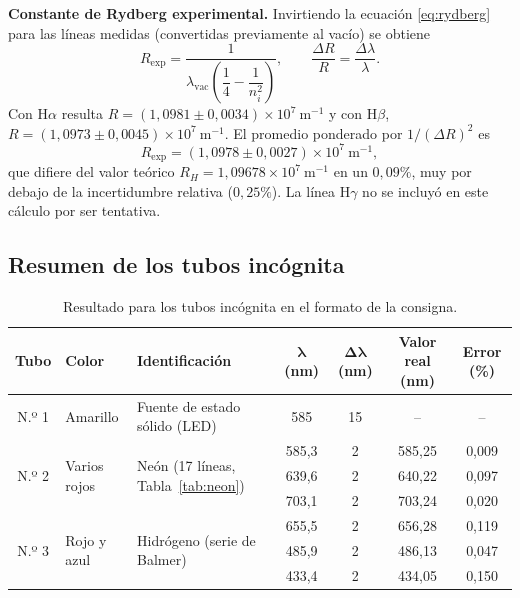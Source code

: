 \documentclass{article}
\begin{document}
\textbf{Constante de Rydberg experimental.} Invirtiendo la ecuación \eqref{eq:rydberg} para las líneas medidas (convertidas previamente al vacío) se obtiene
\begin{equation}
    R_{\mathrm{exp}}=\frac{1}{\lambda_{\mathrm{vac}}\left(\dfrac{1}{4}-\dfrac{1}{n_i^2}\right)},
    \qquad
    \frac{\Delta R}{R}=\frac{\Delta\lambda}{\lambda}.
\end{equation}
Con H$\alpha$ resulta $R=(1,0981\pm0,0034)\times10^{7}\ \mathrm{m^{-1}}$ y con H$\beta$, $R=(1,0973\pm0,0045)\times10^{7}\ \mathrm{m^{-1}}$. El promedio ponderado por $1/(\Delta R)^2$ es
\begin{equation}
    R_{\mathrm{exp}}=(1,0978\pm0,0027)\times10^{7}\ \mathrm{m^{-1}},
\end{equation}
que difiere del valor teórico $R_H=1,09678\times10^{7}\ \mathrm{m^{-1}}$ en un $0,09\%$, muy por debajo de la incertidumbre relativa ($0,25\%$). La línea H$\gamma$ no se incluyó en este cálculo por ser tentativa.

\subsection{Resumen de los tubos incógnita}

\begin{table}[H]
\centering\small
\caption{Resultado para los tubos incógnita en el formato de la consigna.}
\label{tab:incognitas}
\begin{tabular}{@{}cllcccc@{}}
\toprule
\textbf{Tubo} & \textbf{Color} & \textbf{Identificación} & $\boldsymbol{\lambda}$ \textbf{(nm)} & $\boldsymbol{\Delta\lambda}$ \textbf{(nm)} & \textbf{Valor real (nm)} & \textbf{Error (\%)}\\
\midrule
N.º 1 & Amarillo & Fuente de estado sólido (LED) & 585 & 15 & -- & --\\
\midrule
\multirow{3}{*}{N.º 2} & \multirow{3}{*}{Varios rojos} & \multirow{3}{*}{Neón (17 líneas, Tabla~\ref{tab:neon})} & 585,3 & 2 & 585,25 & 0,009\\
 & & & 639,6 & 2 & 640,22 & 0,097\\
 & & & 703,1 & 2 & 703,24 & 0,020\\
\midrule
\multirow{3}{*}{N.º 3} & \multirow{3}{*}{Rojo y azul} & \multirow{3}{*}{Hidrógeno (serie de Balmer)} & 655,5 & 2 & 656,28 & 0,119\\
 & & & 485,9 & 2 & 486,13 & 0,047\\
 & & & 433,4 & 2 & 434,05 & 0,150\\
\bottomrule
\end{tabular}
\end{table}
\end{document}
